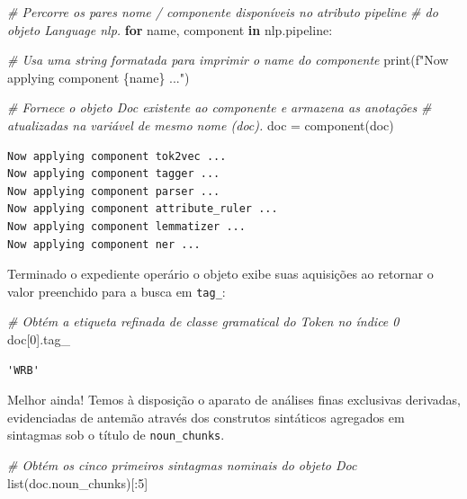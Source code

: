 \documentclass[
  brazilian,
]{article}
\newenvironment{Shaded}{}{}
\newcommand{\BuiltInTok}[1]{#1}
\newcommand{\CommentTok}[1]{\textcolor[rgb]{0.38,0.63,0.69}{\textit{#1}}}
\newcommand{\ControlFlowTok}[1]{\textcolor[rgb]{0.00,0.44,0.13}{\textbf{#1}}}
\newcommand{\DecValTok}[1]{\textcolor[rgb]{0.25,0.63,0.44}{#1}}
\newcommand{\KeywordTok}[1]{\textcolor[rgb]{0.00,0.44,0.13}{\textbf{#1}}}
\newcommand{\NormalTok}[1]{#1}
\newcommand{\OperatorTok}[1]{\textcolor[rgb]{0.40,0.40,0.40}{#1}}
\newcommand{\SpecialCharTok}[1]{\textcolor[rgb]{0.25,0.44,0.63}{#1}}
\newcommand{\SpecialStringTok}[1]{\textcolor[rgb]{0.73,0.40,0.53}{#1}}
\begin{document}
\begin{Shaded}
\begin{Highlighting}[]
\CommentTok{\# Percorre os pares nome / componente disponíveis no atributo \textquotesingle{}pipeline\textquotesingle{}}
\CommentTok{\# do objeto Language \textquotesingle{}nlp\textquotesingle{}.}
\ControlFlowTok{for}\NormalTok{ name, component }\KeywordTok{in}\NormalTok{ nlp.pipeline:}
    
    \CommentTok{\# Usa uma string formatada para imprimir o \textquotesingle{}name\textquotesingle{} do componente}
    \BuiltInTok{print}\NormalTok{(}\SpecialStringTok{f"Now applying component }\SpecialCharTok{\{}\NormalTok{name}\SpecialCharTok{\}}\SpecialStringTok{ ..."}\NormalTok{)}
    
    \CommentTok{\# Fornece o objeto Doc existente ao componente e armazena as anotações}
    \CommentTok{\# atualizadas na variável de mesmo nome (\textquotesingle{}doc\textquotesingle{}).}
\NormalTok{    doc }\OperatorTok{=}\NormalTok{ component(doc)}
\end{Highlighting}
\end{Shaded}

\begin{verbatim}
Now applying component tok2vec ...
Now applying component tagger ...
Now applying component parser ...
Now applying component attribute_ruler ...
Now applying component lemmatizer ...
Now applying component ner ...
\end{verbatim}

Terminado o expediente operário o objeto exibe suas aquisições ao
retornar o valor preenchido para a busca em \texttt{tag\_}:

\begin{Shaded}
\begin{Highlighting}[]
\CommentTok{\# Obtém a etiqueta refinada de classe gramatical do Token no índice 0}
\NormalTok{doc[}\DecValTok{0}\NormalTok{].tag\_}
\end{Highlighting}
\end{Shaded}

\begin{verbatim}
'WRB'
\end{verbatim}

Melhor ainda! Temos à disposição o aparato de análises finas exclusivas
derivadas, evidenciadas de antemão através dos construtos sintáticos
agregados em sintagmas sob o título de \texttt{noun\_chunks}.

\begin{Shaded}
\begin{Highlighting}[]
\CommentTok{\# Obtém os cinco primeiros sintagmas nominais do objeto Doc}
\BuiltInTok{list}\NormalTok{(doc.noun\_chunks)[:}\DecValTok{5}\NormalTok{]}
\end{Highlighting}
\end{Shaded}
\end{document}
